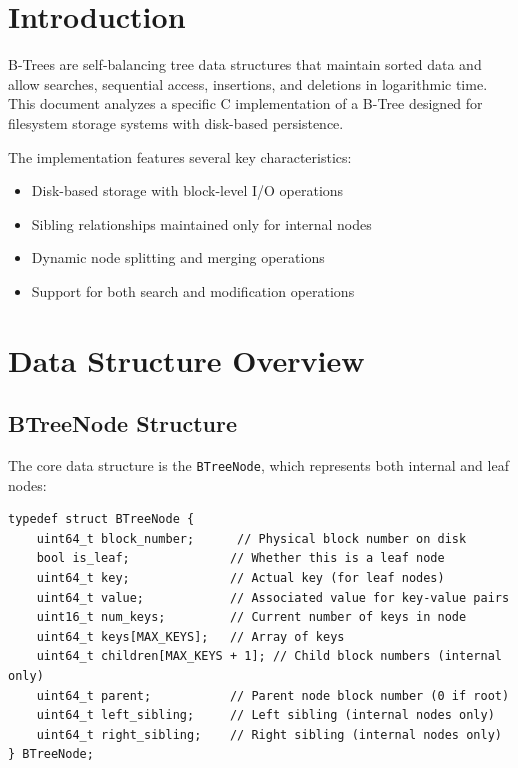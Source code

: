 \documentclass[12pt,a4paper]{article}
\begin{document}
\tableofcontents
\newpage

\section{Introduction}

B-Trees are self-balancing tree data structures that maintain sorted data and allow searches, sequential access, insertions, and deletions in logarithmic time. This document analyzes a specific C implementation of a B-Tree designed for filesystem storage systems with disk-based persistence.

The implementation features several key characteristics:
\begin{itemize}
    \item Disk-based storage with block-level I/O operations
    \item Sibling relationships maintained only for internal nodes
    \item Dynamic node splitting and merging operations
    \item Support for both search and modification operations
\end{itemize}

\section{Data Structure Overview}

\subsection{BTreeNode Structure}

The core data structure is the \texttt{BTreeNode}, which represents both internal and leaf nodes:

\begin{lstlisting}
typedef struct BTreeNode {
    uint64_t block_number;      // Physical block number on disk
    bool is_leaf;              // Whether this is a leaf node
    uint64_t key;              // Actual key (for leaf nodes)
    uint64_t value;            // Associated value for key-value pairs
    uint16_t num_keys;         // Current number of keys in node
    uint64_t keys[MAX_KEYS];   // Array of keys
    uint64_t children[MAX_KEYS + 1]; // Child block numbers (internal only)
    uint64_t parent;           // Parent node block number (0 if root)
    uint64_t left_sibling;     // Left sibling (internal nodes only)
    uint64_t right_sibling;    // Right sibling (internal nodes only)
} BTreeNode;
\end{lstlisting}
\end{document}
